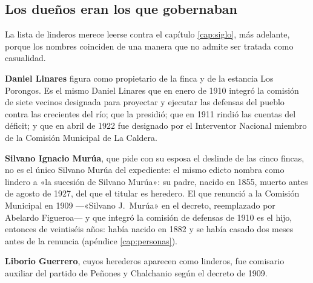 \subsection*{Los dueños eran los que gobernaban}

La lista de linderos merece leerse contra el capítulo \ref{cap:siglo}, más adelante, porque los nombres coinciden de una
manera que no admite ser tratada como casualidad.

\textbf{Daniel Linares} figura como propietario de la finca y de la estancia Los Porongos.
Es el mismo Daniel Linares que en enero de 1910 integró la comisión de siete vecinos
designada para proyectar y ejecutar las defensas del pueblo contra las crecientes del río;
que la presidió; que en 1911 rindió las cuentas del déficit; y que en abril de 1922 fue
designado por el Interventor Nacional miembro de la Comisión Municipal de La Caldera.

\textbf{Silvano Ignacio Murúa}, que pide con su esposa el deslinde de las cinco fincas, no es el único
Silvano Murúa del expediente: el mismo edicto nombra como lindero a «la sucesión de Silvano
Murúa»: su padre, nacido en 1855, muerto antes de agosto de 1927, del que el
titular es heredero. El que renunció a la Comisión Municipal en 1909 ---«Silvano J.\ Murúa» en el
decreto, reemplazado por Abelardo Figueroa--- y que integró la comisión de defensas de 1910 es el
hijo, entonces de veintiséis años: había nacido en 1882 y se había casado dos meses antes de la
renuncia (apéndice \ref{cap:personas}).

\textbf{Liborio Guerrero}, cuyos herederos aparecen como linderos, fue comisario auxiliar del
partido de Peñones y Chalchanio según el decreto de 1909.

